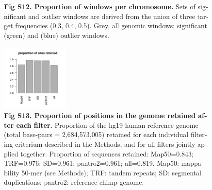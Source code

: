 \begin{refsection}
\begin{otherlanguage}{english}
\begin{figure}[h]
\caption*{\textbf{Fig S12. Proportion of windows per chromosome.}  Sets of significant and outlier windows are derived from the union of three target frequencies (0.3, 0.4, 0.5). Grey, all genomic windows; significant (green) and (blue) outlier windows. 
}
\end{figure}
%
\begin{figure}[h]
\centering
\includegraphics[width=0.3\textwidth,keepaspectratio]{chap2_folder/supp_figures/S13_fig.png}
\caption*{\textbf{Fig S13. Proportion of positions in the genome retained after each filter.}
Proportion of the hg19 human reference genome (total base-pairs = 2,684,573,005) retained for each individual filtering criterium described in the Methods, and for all filters jointly applied together. Proportion of sequences retained: Map50=0.843; TRF=0.976; SD=0.961; pantro2=0.961; all=0.819. Map50: mappability 50-mer (see Methods); TRF: tandem repeats; SD: segmental duplications; pantro2: reference chimp genome. 
}
\end{figure}
%


\end{otherlanguage}
\end{refsection}
